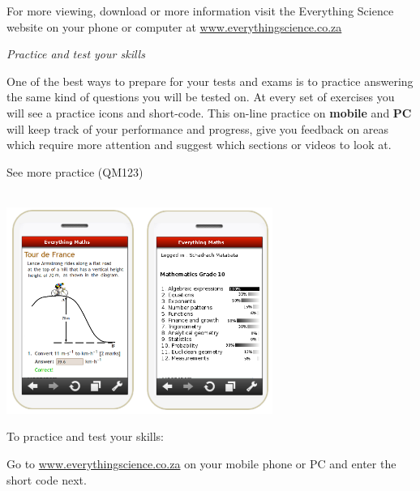 \newpage
\thispagestyle{empty}
{\Large

For more viewing, download or more information visit the Everything Science website on your phone or
computer at \underline{www.everythingscience.co.za}  \par
\vspace*{1cm}
{\normalfont\sffamily\fontsize{22}\normalfont\itshape Practice and test your skills} \par


One of the best ways to prepare for your tests and exams is to practice answering the same kind of
questions you will be tested on. At every set of exercises you will see a practice icons and short-code.
This on-line practice on \textbf{mobile} and \textbf{PC} will keep track of your performance and progress, give you
feedback on areas which require more attention and suggest which sections or videos to look at.

\begin{center}
\caption{See more practice  (QM123)} \\
\includegraphics[width=0.65\textwidth]{title_images/practicephones.png}
\end{center}
\par



To practice and test your skills:\par

Go to \underline{www.everythingscience.co.za} on your mobile phone or PC and enter the short code next.\par

\vspace*{1cm}


}

